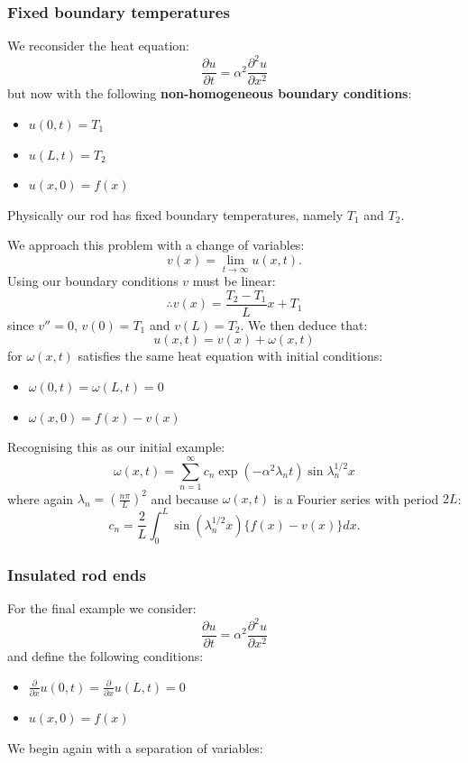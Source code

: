 \documentclass{article}
\begin{document}
\newpage

\subsubsection{Fixed boundary temperatures}
We reconsider the heat equation:
$$\frac{\partial u}{\partial t}=\alpha^2\frac{\partial^2 u}{\partial x^2}$$
but now with the following \textbf{non-homogeneous boundary conditions}:
\begin{itemize}
    \item $u(0,t)=T_1$
    \item $u(L,t)=T_2$
    \item $u(x,0)=f(x)$
\end{itemize}
Physically our rod has fixed boundary temperatures, namely $T_1$ and $T_2$.

We approach this problem with a change of variables:
$$v(x)=\lim_{t\rightarrow\infty}u(x,t).$$
Using our boundary conditions $v$ must be linear:
$$\therefore v(x)=\frac{T_2-T_1}{L}x+T_1$$
since $v''=0$, $v(0)=T_1$ and $v(L)=T_2$. We then deduce that:
$$u(x,t)=v(x)+\omega(x,t)$$
for $\omega(x,t)$ satisfies the same heat equation with initial conditions:
\begin{itemize}
    \item $\omega(0,t)=\omega(L,t)=0$
    \item $\omega(x,0)=f(x)-v(x)$
\end{itemize}
Recognising this as our initial example:
$$\omega(x,t)
=\sum_{n=1}^{\infty}c_n\exp\left(-\alpha^2\lambda_n t\right)
\sin\lambda_n^{1/2} x$$
where again $\lambda_n=\left(\frac{n\pi}{L}\right)^2$ and because $\omega(x,t)$ is a Fourier series with period $2L$:
$$c_n=\frac{2}{L}\int_{0}^{L}\sin(\lambda_n^{1/2} x)\{f(x)-v(x)\} dx.$$

\newpage

\subsubsection{Insulated rod ends}
For the final example we consider:
$$\frac{\partial u}{\partial t}=\alpha^2\frac{\partial^2 u}{\partial x^2}$$
and define the following conditions:
\begin{itemize}
    \item $\displaystyle\frac{\partial}{\partial x}u(0,t)
    =\displaystyle\frac{\partial}{\partial x}u(L,t)=0$
    \item $u(x,0)=f(x)$
\end{itemize}
We begin again with a separation of variables:
\end{document}
